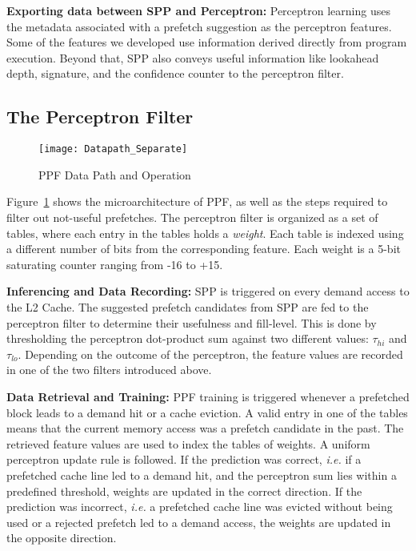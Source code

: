 \noindent \textbf{Exporting data between SPP and Perceptron:}
Perceptron learning uses the metadata associated with a prefetch
suggestion as the perceptron features. Some of the features we
developed use information derived directly from program
execution. Beyond that, SPP also conveys useful information like
lookahead depth, signature, and the confidence counter to the
perceptron filter.

\subsection{The Perceptron Filter}
\label{Enhancements-PPF}

\begin{figure}[ht]
  \begin{center}
  \texttt{[image: Datapath\_Separate]}
  \caption{PPF Data Path and Operation}
  \label{fig:PPF_Datapath}
  \end{center}
\end{figure}

Figure~\ref{fig:PPF_Datapath} shows the microarchitecture of PPF, as
well as the steps required to filter out not-useful prefetches. The
perceptron filter is organized as a set of tables, where each entry in
the tables holds a \textit{weight}. Each table is indexed using a
different number of bits from the corresponding feature. Each weight
is a 5-bit saturating counter ranging from -16 to +15.

\noindent \textbf{Inferencing and Data Recording:} SPP is triggered on
every demand access to the L2 Cache. The suggested prefetch candidates
from SPP are fed to the perceptron filter to determine their
usefulness and fill-level. This is done by thresholding the perceptron
dot-product sum against two different values: $\tau_{hi}$ and
$\tau_{lo}$.  Depending on the outcome of the perceptron, the feature
values are recorded in one of the two filters introduced above.

\noindent \textbf{Data Retrieval and Training:} PPF training is
triggered whenever a prefetched block leads to a demand hit or a cache
eviction. A valid entry in one of the tables means that the current
memory access was a prefetch candidate in the past. The retrieved
feature values are used to index the tables of weights. A uniform
perceptron update rule is followed. If the prediction was correct,
{\em i.e.} if a prefetched cache line led to a demand hit, and the
perceptron sum lies within a predefined threshold, weights are updated
in the correct direction. If the prediction was incorrect, {\em i.e.}
a prefetched cache line was evicted without being used or a rejected
prefetch led to a demand access, the weights are updated in the
opposite direction.

